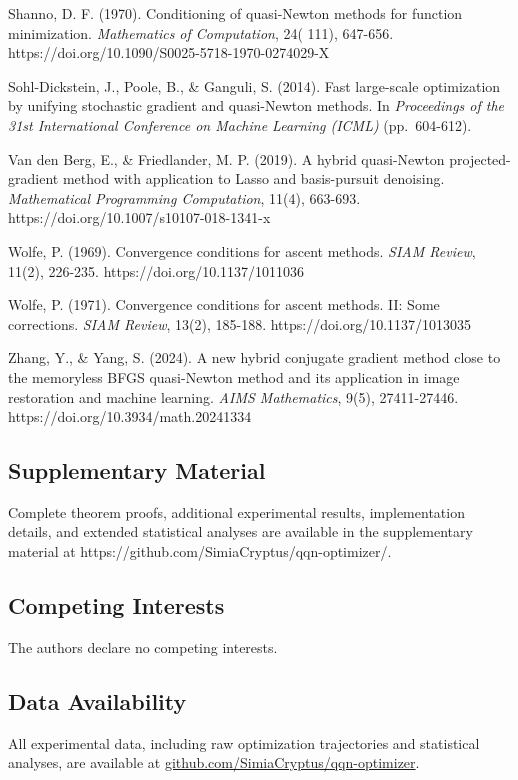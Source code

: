 Shanno, D. F. (1970). Conditioning of quasi-Newton methods for function minimization. \emph{Mathematics of Computation}, 24(
111), 647-656. https://doi.org/10.1090/S0025-5718-1970-0274029-X

Sohl-Dickstein, J., Poole, B., \& Ganguli, S. (2014). Fast large-scale optimization by unifying stochastic gradient and
quasi-Newton methods. In \emph{Proceedings of the 31st International Conference on Machine Learning (ICML)} (pp.~604-612).

Van den Berg, E., \& Friedlander, M. P. (2019). A hybrid quasi-Newton projected-gradient method with application to Lasso
and basis-pursuit denoising. \emph{Mathematical Programming Computation}, 11(4),
663-693. https://doi.org/10.1007/s10107-018-1341-x

Wolfe, P. (1969). Convergence conditions for ascent methods. \emph{SIAM Review}, 11(2),
226-235. https://doi.org/10.1137/1011036

Wolfe, P. (1971). Convergence conditions for ascent methods. II: Some corrections. \emph{SIAM Review}, 13(2),
185-188. https://doi.org/10.1137/1013035

Zhang, Y., \& Yang, S. (2024). A new hybrid conjugate gradient method close to the memoryless BFGS quasi-Newton method
and its application in image restoration and machine learning. \emph{AIMS Mathematics}, 9(5),
27411-27446. https://doi.org/10.3934/math.20241334

\hypertarget{supplementary-material}{%
\subsection{Supplementary Material}\label{supplementary-material}}

Complete theorem proofs, additional experimental results, implementation details, and extended statistical analyses are
available in the supplementary material at https://github.com/SimiaCryptus/qqn-optimizer/.

\hypertarget{competing-interests}{%
\subsection{Competing Interests}\label{competing-interests}}

The authors declare no competing interests.

\hypertarget{data-availability}{%
\subsection{Data Availability}\label{data-availability}}

All experimental data, including raw optimization trajectories and statistical analyses, are available
at \href{https://github.com/SimiaCryptus/qqn-optimizer/}{github.com/SimiaCryptus/qqn-optimizer}.
